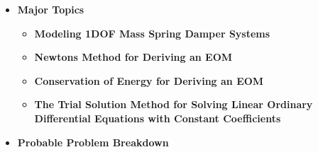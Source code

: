 \documentclass[11pt]{article}
\begin{document}
\begin{itemize}
\begin{itemize}
	\end{itemize}

\item  \textbf{\Large Major Topics}\\
	\begin{itemize}


		\item  \textbf{\Large Modeling 1DOF Mass Spring Damper Systems}\\
		\item  \textbf{\Large Newtons Method for Deriving an EOM}\\
		\item  \textbf{\Large Conservation of Energy for Deriving an EOM}\\
		\item  \textbf{\Large The Trial Solution Method for Solving Linear Ordinary \\Differential Equations with Constant Coefficients}\\
		
	\end{itemize}

\newpage
\item  \textbf{\Large Probable Problem Breakdown}\\
\Large
	\begin{enumerate}



\end{enumerate}
\end{itemize}
\end{document}
